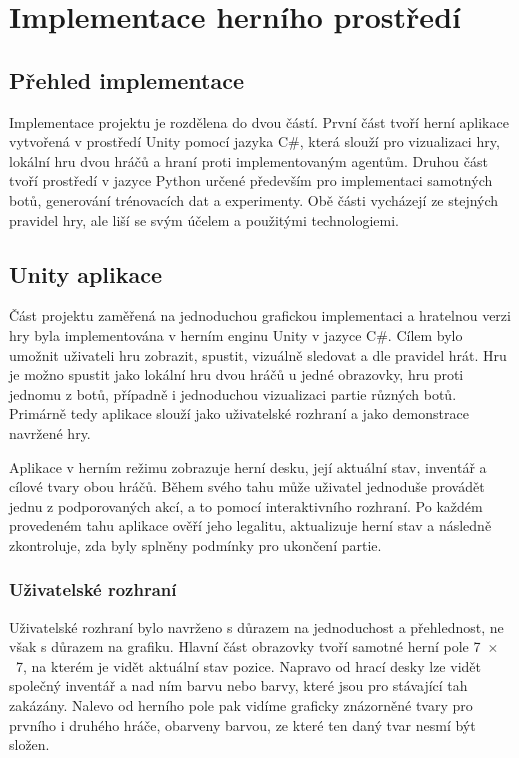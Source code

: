 \chapter{Implementace herního prostředí}

\section{Přehled implementace}

Implementace projektu je rozdělena do dvou částí. První část tvoří herní aplikace vytvořená v prostředí Unity pomocí jazyka C\#,
která slouží pro vizualizaci hry, lokální hru dvou hráčů a hraní proti implementovaným agentům. Druhou část tvoří prostředí v jazyce Python určené 
především pro implementaci samotných botů, generování trénovacích dat a experimenty. Obě části vycházejí ze 
stejných pravidel hry, ale liší se svým účelem a použitými technologiemi.

\section{Unity aplikace}

Část projektu zaměřená na jednoduchou grafickou implementaci a hratelnou verzi hry byla implementována v herním enginu Unity v jazyce C\#.
Cílem bylo umožnit uživateli hru zobrazit, spustit, vizuálně sledovat a dle pravidel hrát. Hru je možno spustit jako lokální hru dvou hráčů u jedné obrazovky,
hru proti jednomu z botů, případně i jednoduchou vizualizaci partie různých botů. Primárně tedy aplikace slouží jako uživatelské rozhraní 
a jako demonstrace navržené hry.

Aplikace v herním režimu zobrazuje herní desku, její aktuální stav, inventář a cílové tvary obou hráčů. Během svého tahu může uživatel 
jednoduše provádět jednu z podporovaných akcí, a to pomocí interaktivního rozhraní. Po každém provedeném tahu aplikace ověří jeho legalitu, 
aktualizuje herní stav a následně zkontroluje, zda byly splněny podmínky pro ukončení partie.

\subsection{Uživatelské rozhraní}

Uživatelské rozhraní bylo navrženo s důrazem na jednoduchost a přehlednost, ne však s důrazem na grafiku. Hlavní část obrazovky tvoří samotné herní pole
7~$\times$~7, na kterém je vidět aktuální stav pozice. Napravo od hrací desky lze vidět společný inventář a nad ním barvu nebo barvy, které jsou pro stávající 
tah zakázány. Nalevo od herního pole pak vidíme graficky znázorněné tvary pro prvního i druhého hráče, obarveny barvou, ze které ten daný tvar nesmí být složen.

